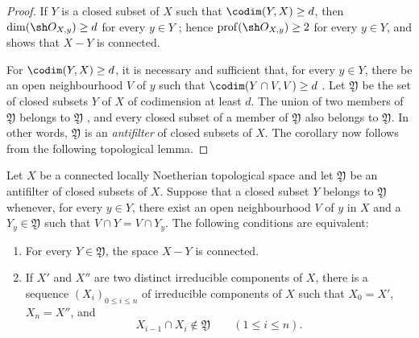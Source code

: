 \begin{proof}
If $Y$ is a closed subset of $X$ such that
$\codim(Y,X)\geq d$, then
$\dim(\sh O_{X,y})\geq d$ for every $y\in Y$
; hence
$\operatorname{prof}(\sh O_{X,y})\geq2$ for every $y\in Y$, and
 shows that $X-Y$ is connected.

For $\codim(Y,X)\geq d$, it is necessary and sufficient that,
for every $y\in Y$, there be an open neighbourhood $V$ of $y$
such that $\codim(Y\cap V,V)\geq d$
.  Let $\mathfrak Y$ be the set of closed
subsets $Y$ of $X$ of codimension at least $d$.  The union of two
members of $\mathfrak Y$ belongs to $\mathfrak Y$
, and every closed subset of a member of
$\mathfrak Y$ also belongs to $\mathfrak Y$.  In other words,
$\mathfrak Y$ is an \emph{antifilter} of closed subsets of $X$.
The corollary now follows from the following topological lemma.
\end{proof}

\begin{lemma}[5.10.8.1]
\label{IV.5.10.8.1}
Let $X$ be a connected locally Noetherian topological space and
let $\mathfrak Y$ be an antifilter of closed subsets of $X$.
Suppose that a closed subset $Y$ belongs to $\mathfrak Y$ whenever,
for every $y\in Y$, there exist an open neighbourhood $V$ of $y$
in $X$ and a $Y_y\in\mathfrak Y$ such that
$V\cap Y=V\cap Y_y$.  The following conditions are equivalent:
\begin{enumerate}[{\rm a)}]
  \item For every $Y\in\mathfrak Y$, the space $X-Y$ is connected.
  \item If $X'$ and $X''$ are two distinct irreducible components
  of $X$, there is a sequence $(X_i)_{0\leq i\leq n}$ of
  irreducible components of $X$ such that $X_0=X'$, $X_n=X''$,
  and
  \[
    X_{i-1}\cap X_i\notin\mathfrak Y
    \qquad(1\leq i\leq n).
  \]
\end{enumerate}
\end{lemma}

